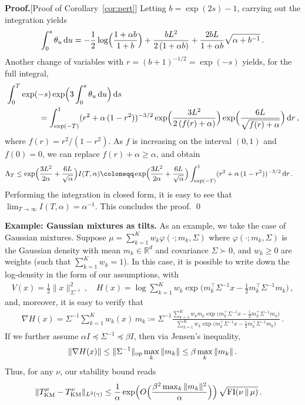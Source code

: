 \documentclass[12pt]{article}
\newcommand{\RR}{\mathbb{R}}
\newcommand{\R}{\RR}
\newcommand{\1}{\mathds{1}}
\newcommand*{\defeq}{\coloneqq}
\newcommand*{\rd}{\mathrm{d}}
\newcommand*{\dd}{\, \rd}
\renewcommand{\phi}{\varphi}
\newcommand{\mmid}{\,\Vert\,}
\def\defeq{\coloneqq} %
\renewenvironment{proof}{\noindent\textbf{Proof.}\hspace*{.3em}}{\qed \vspace{.1in}}
\theoremstyle{plain}
\theoremstyle{definition}
\theoremstyle{remark}
\begin{document}
\begin{proof}[Proof of Corollary~\ref{cor:pert}]
Letting $b = \exp(2{s}) - 1$, carrying out the integration yields
\begin{align*}
    \int_0^{s}\theta_u \dd u = -\frac{1}{2}\log\Bigl(\frac{1+\alpha b}{1+b}\Bigr) + \frac{b L^2}{2\,(1+\alpha b)} + \frac{2 b L}{1+\alpha b}\sqrt{\alpha + b^{-1}}\,.
\end{align*}
Another change of variables with $r = (b+1)^{-1/2} = \exp(-{s})$ yields, for the full integral,
\begin{align*}
 &\int_0^{T} \exp(-{s}) \exp\Bigl(3 \int_0^{{s}} \theta_u \dd u\Bigr)\dd s \\
 &\qquad \qquad =\int_{\exp(-T)}^1 (r^{2} + \alpha\,(1-r^{2}))^{-3/2}\exp\Bigl(\frac{3L^2}{2\,(f(r) + \alpha)}\Bigr)\exp\Bigl(\frac{6L}{\sqrt{f(r) + \alpha}}\Bigr) \dd r\,,
\end{align*}
where $f(r) = r^2/(1-r^2)$. As $f$ is increasing on the interval $(0,1)$ and $f(0) = 0$, we can replace $f(r)  +\alpha \geq \alpha$, and obtain
\begin{align*}
    {\Lambda_T} &\leq \exp\Bigl(\frac{3L^2}{2\alpha} + \frac{6L}{\sqrt{\alpha}}\Bigr) I(T,\alpha) \defeq \exp\Bigl(\frac{3L^2}{2\alpha} + \frac{6L}{\sqrt{\alpha}}\Bigr)  \int_{\exp(-T)}^{1} (r^2 + \alpha\,(1-r^2))^{-3/2} \dd r\,.
\end{align*}
Performing the integration in closed form, it is easy to see that $\lim_{T\to\infty} I(T,\alpha) = \alpha^{-1}$. This concludes the proof.
\end{proof}

\textbf{Example: Gaussian mixtures as tilts.} As an example, we take the case of Gaussian mixtures. Suppose $\mu = \sum_{k=1}^Kw_k\phi(\cdot;m_k,\Sigma)$ where $\phi(\cdot;m_k,\Sigma)$ is the Gaussian density with mean $m_k \in \R^d$ and covariance $\Sigma \succ 0$, and $w_k \geq 0$ are weights (such that $\sum_{k=1}^K w_k = 1$). In this case, it is possible to write down the log-density in the form of our assumptions, with
\begin{align*}
    V(x) = \tfrac{1}{2}\|x\|_{\Sigma^{-1}}^2\,, \quad H(x) = \log\sum_{k=1}^K w_k\exp\bigl(m_k^\top \Sigma^{-1}x - \tfrac12 m_k^\top \Sigma^{-1} m_k \bigr)\,,
\end{align*}
and, moreover, it is easy to verify that
\begin{align*}
    \nabla H(x) = \Sigma^{-1} \sum_{k=1}^K {w}_k(x)\, m_k \defeq \Sigma^{-1} \frac{\sum_{k=1}^K w_k m_k \exp\bigl(m_k^\top \Sigma^{-1}x - \tfrac12m_k^\top \Sigma^{-1}m_k\bigr)}{\sum_{k=1}^K w_k \exp\bigl(m_k^\top \Sigma^{-1}x - \tfrac12m_k^\top \Sigma^{-1}m_k\bigr)}\,.
\end{align*}
If we further assume $\alpha I \preceq \Sigma^{-1} \preceq \beta I$, then via Jensen's inequality,
\begin{align*}
    \|\nabla H(x)\| \leq \|\Sigma^{-1}\|_{\rm op} \max_k \|m_k\| \leq \beta \max_k \|m_k\|\,.
\end{align*}
Thus, for any $\nu$, our stability bound reads
\begin{align*}
\| T_{\rm{KM}}^\mu - T_{\rm{KM}}^\nu\|_{L^2(\gamma)} &\leq \frac{1}{\alpha}\exp\Bigl(O\Bigl(\frac{\beta^2 \max_{k}\|m_k\|^2}{\alpha}\Bigr)\Bigr)\,\sqrt{{\rm FI}(\nu\mmid \mu)}\,.
\end{align*}
\end{document}
